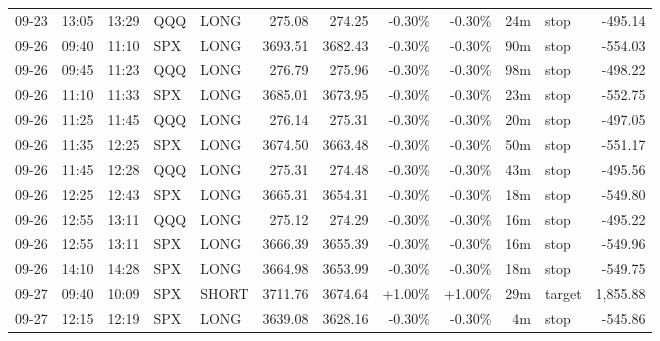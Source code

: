 \documentclass[11pt,a4paper]{article}
\begin{document}
\begin{center}
\begin{longtable}{>{\color{txtmain}}l l l l l r r r r r >{\color{txtmain}}l r}
09-23 & 13:05 & 13:29 & QQQ & LONG & 275.08 & 274.25 & \textcolor{lossred}{-0.30\%} & \textcolor{lossred}{-0.30\%} & 24m & stop & \textcolor{lossred}{-495.14} \\
09-26 & 09:40 & 11:10 & SPX & LONG & 3693.51 & 3682.43 & \textcolor{lossred}{-0.30\%} & \textcolor{lossred}{-0.30\%} & 90m & stop & \textcolor{lossred}{-554.03} \\
09-26 & 09:45 & 11:23 & QQQ & LONG & 276.79 & 275.96 & \textcolor{lossred}{-0.30\%} & \textcolor{lossred}{-0.30\%} & 98m & stop & \textcolor{lossred}{-498.22} \\
09-26 & 11:10 & 11:33 & SPX & LONG & 3685.01 & 3673.95 & \textcolor{lossred}{-0.30\%} & \textcolor{lossred}{-0.30\%} & 23m & stop & \textcolor{lossred}{-552.75} \\
09-26 & 11:25 & 11:45 & QQQ & LONG & 276.14 & 275.31 & \textcolor{lossred}{-0.30\%} & \textcolor{lossred}{-0.30\%} & 20m & stop & \textcolor{lossred}{-497.05} \\
09-26 & 11:35 & 12:25 & SPX & LONG & 3674.50 & 3663.48 & \textcolor{lossred}{-0.30\%} & \textcolor{lossred}{-0.30\%} & 50m & stop & \textcolor{lossred}{-551.17} \\
09-26 & 11:45 & 12:28 & QQQ & LONG & 275.31 & 274.48 & \textcolor{lossred}{-0.30\%} & \textcolor{lossred}{-0.30\%} & 43m & stop & \textcolor{lossred}{-495.56} \\
09-26 & 12:25 & 12:43 & SPX & LONG & 3665.31 & 3654.31 & \textcolor{lossred}{-0.30\%} & \textcolor{lossred}{-0.30\%} & 18m & stop & \textcolor{lossred}{-549.80} \\
09-26 & 12:55 & 13:11 & QQQ & LONG & 275.12 & 274.29 & \textcolor{lossred}{-0.30\%} & \textcolor{lossred}{-0.30\%} & 16m & stop & \textcolor{lossred}{-495.22} \\
09-26 & 12:55 & 13:11 & SPX & LONG & 3666.39 & 3655.39 & \textcolor{lossred}{-0.30\%} & \textcolor{lossred}{-0.30\%} & 16m & stop & \textcolor{lossred}{-549.96} \\
09-26 & 14:10 & 14:28 & SPX & LONG & 3664.98 & 3653.99 & \textcolor{lossred}{-0.30\%} & \textcolor{lossred}{-0.30\%} & 18m & stop & \textcolor{lossred}{-549.75} \\
09-27 & 09:40 & 10:09 & SPX & SHORT & 3711.76 & 3674.64 & \textcolor{wingreen}{+1.00\%} & \textcolor{wingreen}{+1.00\%} & 29m & target & \textcolor{wingreen}{1,855.88} \\
09-27 & 12:15 & 12:19 & SPX & LONG & 3639.08 & 3628.16 & \textcolor{lossred}{-0.30\%} & \textcolor{lossred}{-0.30\%} & 4m & stop & \textcolor{lossred}{-545.86} \\

\end{longtable}
\end{center}
\end{document}
